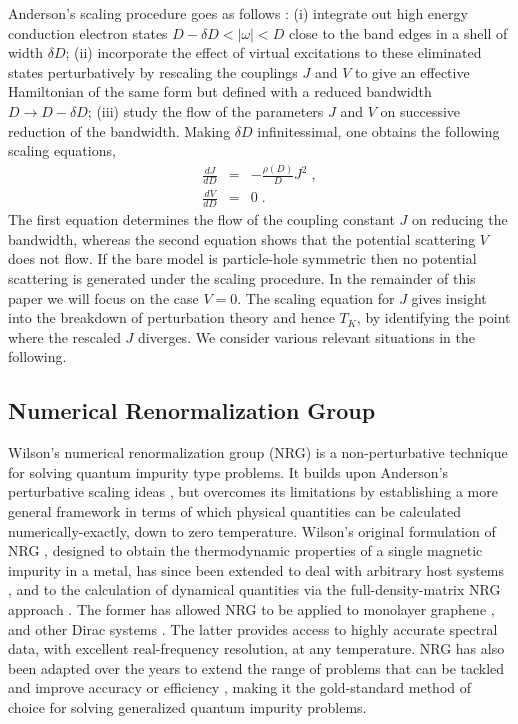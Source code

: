 Anderson's scaling procedure goes as follows \cite{anderson1970poor}: (i) integrate out high energy conduction electron states $D-\delta D<|\omega|<D$ close to the band edges in a shell of width $\delta D$; (ii) incorporate the effect of virtual excitations to these eliminated states perturbatively by rescaling the couplings $J$ and $V$ to give an effective Hamiltonian of the same form but defined with a reduced bandwidth $D\to D-\delta D$; (iii) study the flow of the parameters $J$ and $V$ on successive reduction of the bandwidth. Making $\delta D$ infinitessimal, one obtains the following scaling equations,
\begin{eqnarray}\label{eq:poorman}
	\frac{dJ}{d D}&=&-\frac{\rho(D)}{D}J^2 \;, \nonumber \\ 
	\frac{dV}{d D}&=&0\;.
\end{eqnarray}
The first equation determines the flow of the coupling constant $J$ on reducing the bandwidth, whereas the second equation shows that the potential scattering $V$ does not flow. If the bare model is particle-hole symmetric then no potential scattering is generated under the scaling procedure. In the remainder of this paper we will focus on the case $V=0$. The scaling equation for $J$ gives insight into the breakdown of perturbation theory and hence $T_K$, by identifying the point where the rescaled $J$ diverges. We consider various relevant situations in the following. 


\subsection{Numerical Renormalization Group}\label{subsec:nrg}

Wilson's numerical renormalization group \cite{wilson1975renormalization,bulla2008numerical} (NRG) is a non-perturbative technique for solving quantum impurity type problems. It builds upon Anderson's perturbative scaling ideas \cite{anderson1970poor}, but overcomes its limitations by establishing a more general framework in terms of which physical quantities can be calculated numerically-exactly, down to zero temperature. Wilson's original formulation of NRG \cite{wilson1975renormalization}, designed to obtain the thermodynamic properties of a single magnetic impurity in a metal, has since been extended to deal with arbitrary host systems \cite{chen1995kondo,*bulla1997anderson,bulla2008numerical}, and to the calculation of dynamical quantities via the full-density-matrix NRG approach \cite{anders2006spin,weichselbaum2007sum}. The former has allowed NRG to be applied to monolayer graphene \cite{vojta2010gate}, and other Dirac systems \cite{mitchell2013TI, mitchell2015kondo}. The latter provides access to highly accurate spectral data, with excellent real-frequency resolution, at any temperature. NRG has also been adapted over the years to extend the range of problems that can be tackled and improve accuracy or efficiency \cite{bulla1998numerical,oliveira1994generalized,bulla2003numerical,pruschke2009energy,mitchell2014generalized,*stadler2016interleaved,lee2021computing,rigo2022automatic}, making it the gold-standard method of choice for solving generalized quantum impurity problems.

